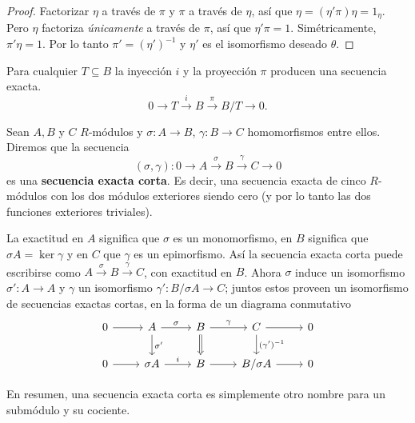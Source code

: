 \begin{proof}
	Factorizar \(\eta\) a través de \(\pi\) y \(\pi\) a través de \(\eta\), así que \(\eta = (\eta' \pi) \eta = 1_\eta\). Pero \(\eta\) factoriza \textit{únicamente} a través de \(\pi\), así que \(\eta' \pi = 1\). Simétricamente, \(\pi' \eta = 1\). Por lo tanto \(\pi' = (\eta')^{-1}\) y \(\eta'\) es el isomorfismo deseado \(\theta\).
\end{proof}

Para cualquier \(T \subseteq B\) la inyección \(i\) y la proyección \(\pi\) producen una secuencia exacta.
\[ 0 \rightarrow T \xrightarrow{i} B \xrightarrow{\pi} B/T \rightarrow 0. \]

\begin{definicion}
Sean $A,B$ y $C$ $R$-módulos y $\sigma: A \rightarrow B$, $\gamma: B \rightarrow C$ homomorfismos entre ellos. Diremos que la secuencia 
\[ (\sigma, \gamma): 0 \rightarrow A \xrightarrow{\sigma} B \xrightarrow{\gamma} C \rightarrow 0 \]
es una \textbf{secuencia exacta corta}. Es decir, una secuencia exacta de cinco \(R\)-módulos con los dos módulos exteriores siendo cero (y por lo tanto las dos funciones exteriores triviales).
\end{definicion}

La exactitud en \(A\) significa que \(\sigma\) es un monomorfismo, en \(B\) significa que \(\sigma A = \ker \gamma\) y en \(C\) que \(\gamma\) es un epimorfismo. Así la secuencia exacta corta puede escribirse como \(A \xrightarrow{\sigma} B \xrightarrow{\gamma} C\), con exactitud en \(B\). Ahora \(\sigma\) induce un isomorfismo \(\sigma': A \to A\) y \(\gamma\) un isomorfismo \(\gamma': B/\sigma A \to C\); juntos estos proveen un isomorfismo de secuencias exactas cortas, en la forma de un diagrama conmutativo
\[
\begin{tikzcd}
	0 \arrow[r] & A \arrow[r, "\sigma"] \arrow[d, "\sigma'"] & B \arrow[r, "\gamma"] \arrow[d, no head, Rightarrow] & C \arrow[r] \arrow[d, "(\gamma')^{-1}"] & 0 \\
	0 \arrow[r] & \sigma A \arrow[r, "i"]                    & B \arrow[r]                                          & B/\sigma A \arrow[r]                    & 0
\end{tikzcd}
\]

En resumen, una secuencia exacta corta es simplemente otro nombre para un submódulo y su cociente.

